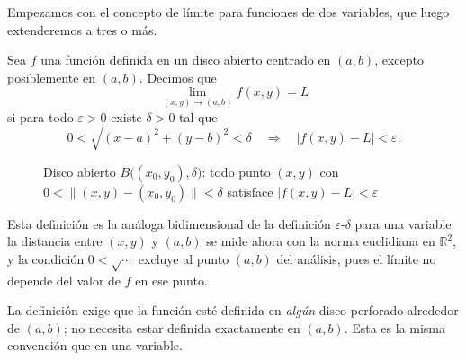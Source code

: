 Empezamos con el concepto de límite para funciones de dos variables,
que luego extenderemos a tres o más.

\begin{definition}
Sea $f$ una función definida en un disco abierto centrado en $(a,b)$,
excepto posiblemente en $(a,b)$. Decimos que
\[
\lim_{(x,y)\to(a,b)} f(x,y) = L
\]
si para todo $\varepsilon>0$ existe $\delta>0$ tal que
\[
0 < \sqrt{(x-a)^2 + (y-b)^2} < \delta
\quad\Longrightarrow\quad
|f(x,y)-L| < \varepsilon.
\]
\end{definition}

\begin{figure}[!htbp]
\centering
{}
\caption{Disco abierto $B\bigl((x_0,y_0),\delta\bigr)$: todo punto
         $(x,y)$ con $0<\|(x,y)-(x_0,y_0)\|<\delta$ satisface
         $|f(x,y)-L|<\varepsilon$}
\label{fig:disco_epsilon_delta}
\end{figure}

Esta definición es la análoga bidimensional de la definición
$\varepsilon$-$\delta$ para una variable: la distancia entre $(x,y)$ y
$(a,b)$ se mide ahora con la norma euclidiana en $\mathbb{R}^2$, y
la condición $0<\sqrt{\cdots}$ excluye al punto $(a,b)$ del análisis,
pues el límite no depende del valor de $f$ en ese punto.

\begin{rem}
La definición exige que la función esté definida en \emph{algún}
disco perforado alrededor de $(a,b)$; no necesita estar definida
exactamente en $(a,b)$. Esta es la misma convención que en una
variable.
\end{rem}

